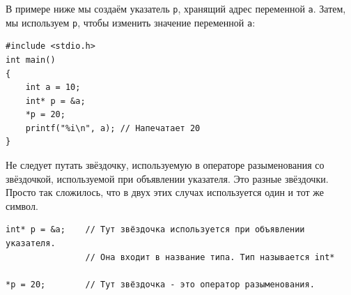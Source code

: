 \documentclass{article}
\begin{document}
В примере ниже мы создаём указатель \texttt{p}, хранящий адрес переменной \texttt{a}. Затем, мы используем \texttt{p}, чтобы изменить значение переменной \texttt{a}:
\begin{lstlisting}
#include <stdio.h>
int main() 
{
    int a = 10;
    int* p = &a;
    *p = 20;
    printf("%i\n", a); // Напечатает 20
}
\end{lstlisting}

Не следует путать звёздочку, используемую в операторе разыменования со звёздочкой, используемой при объявлении указателя. 
Это разные звёздочки. Просто так сложилось, что в двух этих случах используется один и тот же символ.
\begin{lstlisting}
int* p = &a;    // Тут звёздочка используется при объявлении указателя. 
                // Она входит в название типа. Тип называется int*

*p = 20;        // Тут звёздочка - это оператор разыменования.
\end{lstlisting}

\newpage
\end{document}
